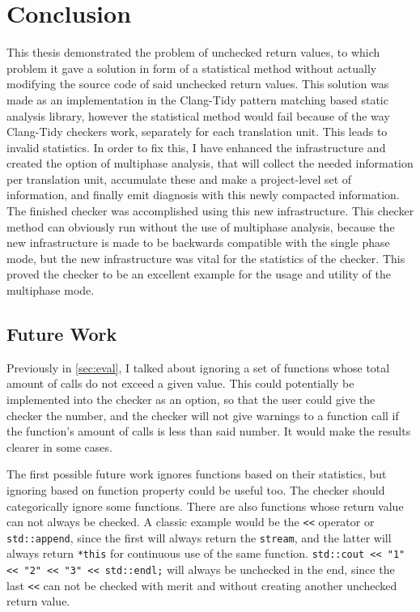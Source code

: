 
\chapter{Conclusion}
\label{ch:sum}

This thesis demonstrated the problem of unchecked return values, to which problem it gave a solution in form of a statistical method without
actually modifying the source code of said unchecked return values. This solution was made as an implementation in the Clang-Tidy pattern
matching based static analysis library, however the statistical method would fail because of the way Clang-Tidy checkers work, separately
for each translation unit. This leads to invalid statistics. In order to fix this, I have enhanced the infrastructure and created the
option of multiphase analysis, that will collect the needed information per translation unit, accumulate these and make a project-level set
of information, and finally emit diagnosis with this newly compacted information. The finished checker was accomplished using this new
infrastructure. This checker method can obviously run without the use of multiphase analysis, because the new infrastructure is made to be
backwards compatible with the single phase mode, but the new infrastructure was vital for the statistics of the checker. This proved the
checker to be an excellent example for the usage and utility of the multiphase mode.

\section{Future Work}

Previously in \cref{sec:eval}, I talked about ignoring a set of functions whose total amount of calls do not exceed a given value. This could
potentially be implemented into the checker as an option, so that the user could give the checker the number, and the checker will not give
warnings to a function call if the function's amount of calls is less than said number. It would make the results clearer in some cases.

The first possible future work ignores functions based on their statistics, but ignoring based on function property could be useful too.
The checker should categorically ignore some functions. There are also functions whose return value can not always be checked. A classic
example would be the \texttt{<<} operator or \texttt{std::append}, since the first will always return the \texttt{stream}, and the latter
will always return \texttt{*this} for continuous use of the same function. \texttt{std::cout << "1" << "2" << "3" << std::endl;} will
always be unchecked in the end, since the last \lstinline{<<} can not be checked with merit and without creating another unchecked return value.

